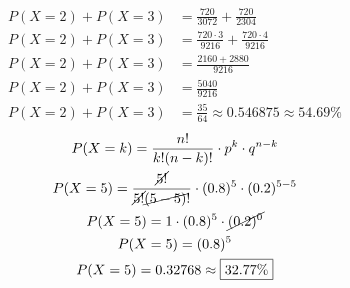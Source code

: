\documentclass{jhwhw}
\begin{document}
\begin{align*}
	P(X = 2) + P(X = 3) & = \frac{720}{3072} + \frac{720}{2304}                    \\
	P(X = 2) + P(X = 3) & = \frac{720 \cdot 3}{9216} + \frac{720 \cdot 4}{9216}    \\
	P(X = 2) + P(X = 3) & = \frac{2160 + 2880}{9216}                               \\
	P(X = 2) + P(X = 3) & = \frac{5040}{9216}                                      \\
	P(X = 2) + P(X = 3) & = \frac{35}{64} \approx 0.546875 \approx \boxed{54.69\%}
\end{align*}
\begin{gather*}
	P(X = k) = \frac{n!}{k!(n-k)!} \cdot p^k \cdot q^{n-k} \\
	P(X = 5) = \frac{\cancel{5!}}{\cancel{5!}\cancel{(5-5)}!} \cdot (0.8)^5 \cdot (0.2)^{5-5} \\
	P(X = 5) = 1 \cdot (0.8)^5 \cdot \cancel{(0.2)^0} \\
	P(X = 5) = (0.8)^5 \\
	P(X = 5) = 0.32768 \approx \boxed{32.77\%}
\end{gather*}
\end{document}

